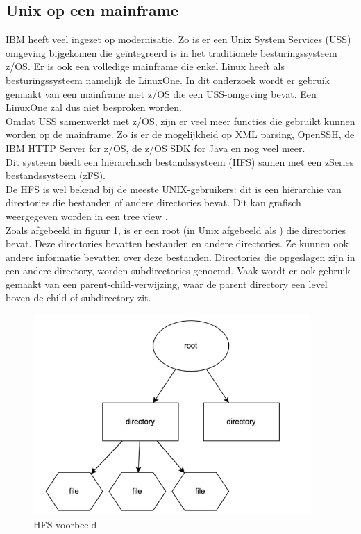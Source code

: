 \subsection{Unix op een mainframe}
IBM heeft veel ingezet op modernisatie. Zo is er een Unix System Services (USS) omgeving bijgekomen die geïntegreerd is in het traditionele besturingssysteem z/OS. Er is ook een volledige mainframe die enkel Linux heeft als besturingssysteem namelijk de LinuxOne. In dit onderzoek wordt er gebruik gemaakt van een mainframe met z/OS die een USS-omgeving bevat. Een LinuxOne zal dus niet besproken worden. \\

Omdat USS samenwerkt met z/OS, zijn er veel meer functies die gebruikt kunnen worden op de mainframe. Zo is er de mogelijkheid op XML parsing, OpenSSH, de IBM HTTP Server for z/OS, de z/OS SDK for Java en nog veel meer. \autocite{Dhawan2013} \\
 
Dit systeem biedt een hiërarchisch bestandssysteem (HFS) samen met een zSeries bestandssysteem (zFS). \autocite{Precisely2020} \\ De HFS is wel bekend bij de meeste UNIX-gebruikers: dit is een hiërarchie van directories die bestanden of andere directories bevat. Dit kan grafisch weergegeven worden in een tree view \autocite{HCLTechnologies2022}. \\ 

Zoals afgebeeld in figuur \ref{fig:HFS}, is er een root (in Unix afgebeeld als \textquote{/}) die directories bevat. Deze directories bevatten bestanden en andere directories. Ze kunnen ook andere informatie bevatten over deze bestanden. Directories die opgeslagen zijn in een andere directory, worden subdirectories genoemd. Vaak wordt er ook gebruik gemaakt van een parent-child-verwijzing, waar de parent directory een level boven de child of subdirectory zit. \autocite{Codecadamy2022} \\

\begin{figure}[pt!]
    \centering
    \includegraphics[width=300pt]{./graphics/HFS.png}
    \caption{HFS voorbeeld \autocite{Codecadamy2022}}
    \label{fig:HFS}
\end{figure}

